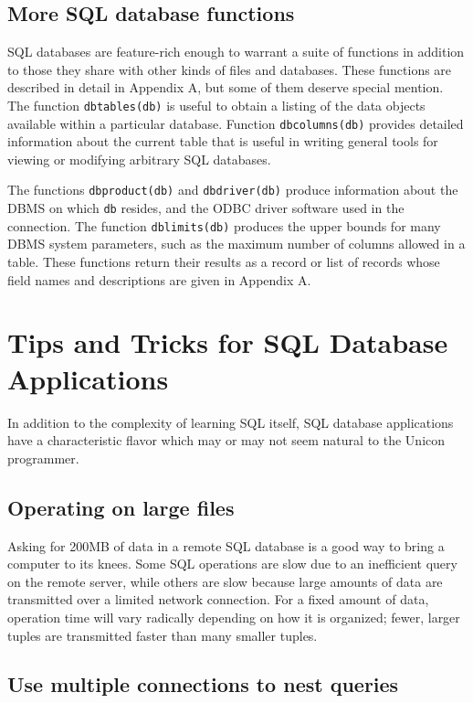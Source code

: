 \subsection*{More SQL database functions}

SQL databases are feature-rich enough to warrant a suite
of functions in addition to those they
share with other kinds of files and databases. These functions are
described in detail in Appendix A, but some of them deserve special
mention. The function \texttt{dbtables(db)} is useful to obtain a
listing of the data objects available within a particular database.
Function \texttt{dbcolumns(db)} provides detailed information about the
current table that is useful in writing general tools for viewing or
modifying arbitrary SQL databases.

The functions \texttt{dbproduct(db)} and \texttt{dbdriver(db)} produce
information about the DBMS on which \texttt{db} resides, and the
ODBC driver software used in the connection.
The function \texttt{dblimits(db)} produces the upper bounds for many
DBMS system parameters, such as the maximum number of columns allowed
in a table. These functions return their results as
a record or list of records whose field names and descriptions
are given in Appendix A.

\section{Tips and Tricks for SQL Database Applications}

In addition to the complexity of learning SQL itself, SQL database
applications have a characteristic flavor which may or may not seem
natural to the Unicon programmer.

\subsection*{Operating on large files}

Asking for 200MB of data in a remote SQL database is a good way to
bring a computer to its knees. Some SQL operations are slow due to an
inefficient query on the remote server, while others are slow because
large amounts of data are transmitted over a limited network
connection. For a fixed amount of data, operation time will vary
radically depending on how it is organized; fewer, larger tuples are
transmitted faster than many smaller tuples.

\subsection*{Use multiple connections to nest queries}


